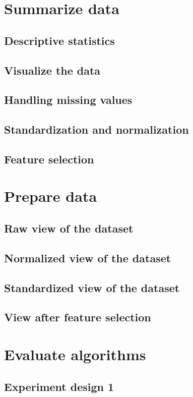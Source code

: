 \chapter{Summarize data}

\section{Descriptive statistics}
\section{Visualize the data}
\section{Handling missing values}
\section{Standardization and normalization}
\section{Feature selection}

\chapter{Prepare data}

\section{Raw view of the dataset}
\section{Normalized view of the dataset}
\section{Standardized view of the dataset}
\section{View after feature selection}

\chapter{Evaluate algorithms}

\section{Experiment design 1}

